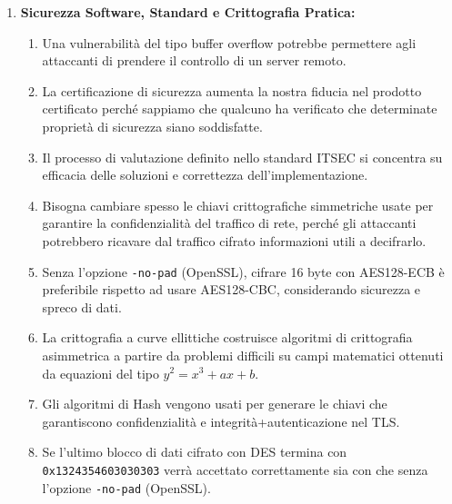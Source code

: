 \documentclass[11pt,a4paper]{article}
\begin{document}
\begin{questionbox}
\begin{enumerate}[label=\textbf{1.\arabic*}]
    \item \textbf{Sicurezza Software, Standard e Crittografia Pratica:}
    \begin{enumerate}[label=\alph*.]
        \item Una vulnerabilit\`a del tipo buffer overflow potrebbe permettere agli attaccanti di prendere il controllo di un server remoto.
        \item La certificazione di sicurezza aumenta la nostra fiducia nel prodotto certificato perch\'e sappiamo che qualcuno ha verificato che determinate propriet\`a di sicurezza siano soddisfatte.
        \item Il processo di valutazione definito nello standard ITSEC si concentra su efficacia delle soluzioni e correttezza dell'implementazione.
        \item Bisogna cambiare spesso le chiavi crittografiche simmetriche usate per garantire la confidenzialit\`a del traffico di rete, perch\'e gli attaccanti potrebbero ricavare dal traffico cifrato informazioni utili a decifrarlo.
        \item Senza l'opzione \texttt{-no-pad} (OpenSSL), cifrare 16 byte con AES128-ECB \`e preferibile rispetto ad usare AES128-CBC, considerando sicurezza e spreco di dati.
        \item La crittografia a curve ellittiche costruisce algoritmi di crittografia asimmetrica a partire da problemi difficili su campi matematici ottenuti da equazioni del tipo $y^2 = x^3 + ax + b$.
        \item Gli algoritmi di Hash vengono usati per generare le chiavi che garantiscono confidenzialit\`a e integrit\`a+autenticazione nel TLS.
        \item Se l'ultimo blocco di dati cifrato con DES termina con \texttt{0x1324354603030303} verr\`a accettato correttamente sia con che senza l'opzione \texttt{-no-pad} (OpenSSL).
    \end{enumerate}
\end{enumerate}
\end{questionbox}
\end{document}
